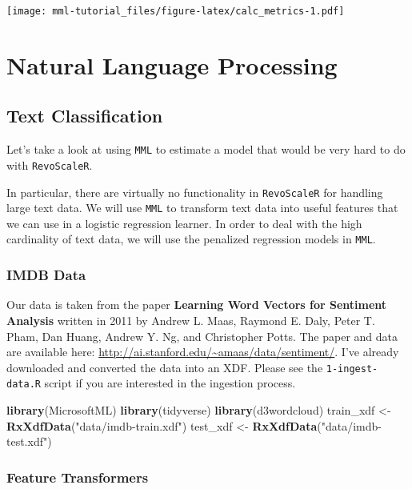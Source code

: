 \documentclass[]{book}
\newenvironment{Shaded}{\begin{snugshade}}{\end{snugshade}}
\newcommand{\KeywordTok}[1]{\textcolor[rgb]{0.13,0.29,0.53}{\textbf{#1}}}
\newcommand{\StringTok}[1]{\textcolor[rgb]{0.31,0.60,0.02}{#1}}
\newcommand{\NormalTok}[1]{#1}
\theoremstyle{definition}
\theoremstyle{definition}
\theoremstyle{definition}
\theoremstyle{remark}
\begin{document}
\texttt{[image: mml-tutorial\_files/figure-latex/calc\_metrics-1.pdf]}

\chapter{Natural Language Processing}\label{natural-language-processing}

\section{Text Classification}\label{text-classification}

Let's take a look at using \texttt{MML} to estimate a model that would
be very hard to do with \texttt{RevoScaleR}.

In particular, there are virtually no functionality in
\texttt{RevoScaleR} for handling large text data. We will use
\texttt{MML} to transform text data into useful features that we can use
in a logistic regression learner. In order to deal with the high
cardinality of text data, we will use the penalized regression models in
\texttt{MML}.

\subsection{IMDB Data}\label{imdb-data}

Our data is taken from the paper \textbf{Learning Word Vectors for
Sentiment Analysis} written in 2011 by Andrew L. Maas, Raymond E. Daly,
Peter T. Pham, Dan Huang, Andrew Y. Ng, and Christopher Potts. The paper
and data are available here:
\url{http://ai.stanford.edu/~amaas/data/sentiment/}. I've already
downloaded and converted the data into an XDF. Please see the
\texttt{1-ingest-data.R} script if you are interested in the ingestion
process.

\begin{Shaded}
\begin{Highlighting}[]
\KeywordTok{library}\NormalTok{(MicrosoftML)}
\KeywordTok{library}\NormalTok{(tidyverse)}
\KeywordTok{library}\NormalTok{(d3wordcloud)}
\NormalTok{train_xdf <-}\StringTok{ }\KeywordTok{RxXdfData}\NormalTok{(}\StringTok{"data/imdb-train.xdf"}\NormalTok{)}
\NormalTok{test_xdf <-}\StringTok{ }\KeywordTok{RxXdfData}\NormalTok{(}\StringTok{"data/imdb-test.xdf"}\NormalTok{)}
\end{Highlighting}
\end{Shaded}

\subsection{Feature Transformers}\label{feature-transformers}
\end{document}
